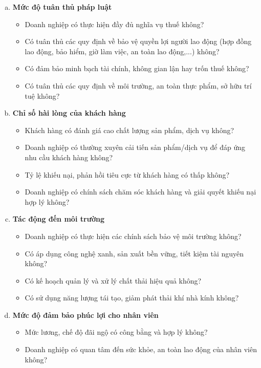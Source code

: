 \documentclass{article}
\begin{document}
    \begin{enumerate}[a.]
        \item \textbf{Mức độ tuân thủ pháp luật}
        \begin{itemize}
            \item Doanh nghiệp có thực hiện đầy đủ nghĩa vụ thuế không?
            \item Có tuân thủ các quy định về bảo vệ quyền lợi người lao động (hợp đồng lao động, bảo hiểm, giờ làm việc, an toàn lao động,...) không?
            \item Có đảm bảo minh bạch tài chính, không gian lận hay trốn thuế không?
            \item Có tuân thủ các quy định về môi trường, an toàn thực phẩm, sở hữu trí tuệ không?
        \end{itemize}
        \item \textbf{Chỉ số hài lòng của khách hàng}
        \begin{itemize}
            \item Khách hàng có đánh giá cao chất lượng sản phẩm, dịch vụ không?
            \item Doanh nghiệp có thường xuyên cải tiến sản phẩm/dịch vụ để đáp ứng nhu cầu khách hàng không?
            \item Tỷ lệ khiếu nại, phản hồi tiêu cực từ khách hàng có thấp không?
            \item Doanh nghiệp có chính sách chăm sóc khách hàng và giải quyết khiếu nại hợp lý không?
        \end{itemize}
        \item \textbf{Tác động đến môi trường}
        \begin{itemize}
            \item Doanh nghiệp có thực hiện các chính sách bảo vệ môi trường không?
            \item Có áp dụng công nghệ xanh, sản xuất bền vững, tiết kiệm tài nguyên không?
            \item Có kế hoạch quản lý và xử lý chất thải hiệu quả không?
            \item Có sử dụng năng lượng tái tạo, giảm phát thải khí nhà kính không?
        \end{itemize}  
        \item \textbf{Mức độ đảm bảo phúc lợi cho nhân viên}
        \begin{itemize}
            \item Mức lương, chế độ đãi ngộ có công bằng và hợp lý không?
            \item Doanh nghiệp có quan tâm đến sức khỏe, an toàn lao động của nhân viên không?

\end{itemize}
\end{enumerate}
\end{document}
